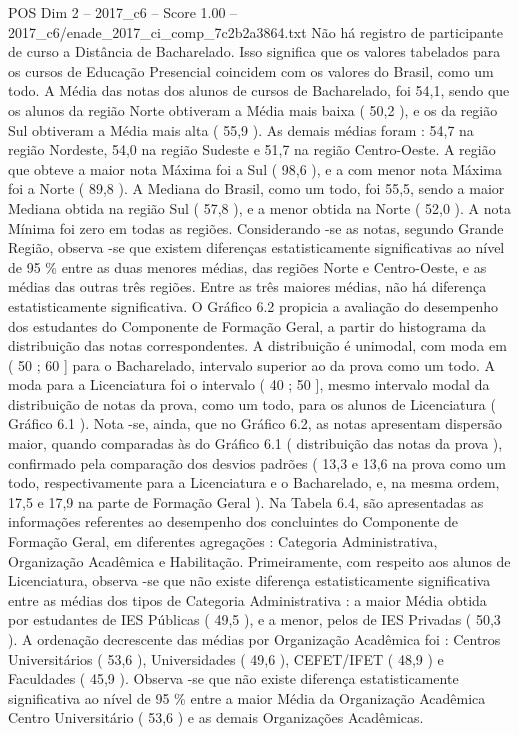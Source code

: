 \begin{textsample}{POS Dim 2 – 2017\_c6 – Score 1.00 – 2017\_c6/enade\_2017\_ci\_comp\_7c2b2a3864.txt}
Não há registro de participante de curso a Distância de Bacharelado.
Isso significa que os valores tabelados para os cursos de Educação Presencial coincidem com os valores do Brasil, como um todo.
A Média das notas dos alunos de cursos de Bacharelado, foi 54,1, sendo que os alunos da região Norte obtiveram a Média mais baixa ( 50,2 ), e os da região Sul obtiveram a Média mais alta ( 55,9 ).
As demais médias foram : 54,7 na região Nordeste, 54,0 na região Sudeste e 51,7 na região Centro-Oeste.
A região que obteve a maior nota Máxima foi a Sul ( 98,6 ), e a com menor nota Máxima foi a Norte ( 89,8 ).
A Mediana do Brasil, como um todo, foi 55,5, sendo a maior Mediana obtida na região Sul ( 57,8 ), e a menor obtida na Norte ( 52,0 ).
A nota Mínima foi zero em todas as regiões.
Considerando -se as notas, segundo Grande Região, observa -se que existem diferenças estatisticamente significativas ao nível de 95 \% entre as duas menores médias, das regiões Norte e Centro-Oeste, e as médias das outras três regiões.
Entre as três maiores médias, não há diferença estatisticamente significativa.
O Gráfico 6.2 propicia a avaliação do desempenho dos estudantes do Componente de Formação Geral, a partir do histograma da distribuição das notas correspondentes.
A distribuição é unimodal, com moda em ( 50 ; 60 ] para o Bacharelado, intervalo superior ao da prova como um todo.
A moda para a Licenciatura foi o intervalo ( 40 ; 50 ], mesmo intervalo modal da distribuição de notas da prova, como um todo, para os alunos de Licenciatura ( Gráfico 6.1 ).
Nota -se, ainda, que no Gráfico 6.2, as notas apresentam dispersão maior, quando comparadas às do Gráfico 6.1 ( distribuição das notas da prova ), confirmado pela comparação dos desvios padrões ( 13,3 e 13,6 na prova como um todo, respectivamente para a Licenciatura e o Bacharelado, e, na mesma ordem, 17,5 e 17,9 na parte de Formação Geral ).
Na Tabela 6.4, são apresentadas as informações referentes ao desempenho dos concluintes do Componente de Formação Geral, em diferentes agregações : Categoria Administrativa, Organização Acadêmica e Habilitação.
Primeiramente, com respeito aos alunos de Licenciatura, observa -se que não existe diferença estatisticamente significativa entre as médias dos tipos de Categoria Administrativa : a maior Média obtida por estudantes de IES Públicas ( 49,5 ), e a menor, pelos de IES Privadas ( 50,3 ).
A ordenação decrescente das médias por Organização Acadêmica foi : Centros Universitários ( 53,6 ), Universidades ( 49,6 ), CEFET/IFET ( 48,9 ) e Faculdades ( 45,9 ).
Observa -se que não existe diferença estatisticamente significativa ao nível de 95 \% entre a maior Média da Organização Acadêmica Centro Universitário ( 53,6 ) e as demais Organizações Acadêmicas.

\end{textsample}
